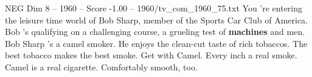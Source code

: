 \begin{textsample}{NEG Dim 8 – 1960 – Score -1.00 – 1960/tv\_com\_1960\_75.txt}  \label{ex:f8_neg_036}
You 're entering the leisure time world of Bob Sharp, member of the Sports Car Club of America.
Bob 's qualifying on a challenging course, a grueling test of \textbf{machines} and men.
Bob Sharp 's a camel smoker.
He enjoys the clean-cut taste of rich tobaccos.
The best tobacco makes the best smoke.
Get with Camel.
Every inch a real smoke.
Camel is a real cigarette.
Comfortably smooth, too.

\end{textsample}
